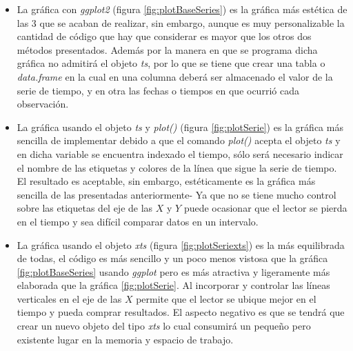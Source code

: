 \documentclass[
  spanish,
]{book}
\providecommand{\tightlist}{%
  \setlength{\itemsep}{0pt}\setlength{\parskip}{0pt}}
\theoremstyle{remark}
\begin{document}
\begin{itemize}
\tightlist
\item
  La gráfica con \emph{ggplot2} (figura \ref{fig:plotBaseSeries}) es la gráfica más estética de las 3 que se acaban de realizar, sin embargo, aunque es muy personalizable la cantidad de código que hay que considerar es mayor que los otros dos métodos presentados. Además por la manera en que se programa dicha gráfica no admitirá el objeto \emph{ts}, por lo que se tiene que crear una tabla o \emph{data.frame} en la cual en una columna deberá ser almacenado el valor de la serie de tiempo, y en otra las fechas o tiempos en que ocurrió cada observación.
\item
  La gráfica usando el objeto \emph{ts} y \emph{plot()} (figura \ref{fig:plotSerie}) es la gráfica más sencilla de implementar debido a que el comando \emph{plot()} acepta el objeto \emph{ts} y en dicha variable se encuentra indexado el tiempo, sólo será necesario indicar el nombre de las etiquetas y colores de la línea que sigue la serie de tiempo. El resultado es aceptable, sin embargo, estéticamente es la gráfica más sencilla de las presentadas anteriormente- Ya que no se tiene mucho control sobre las etiquetas del eje de las \(X\) y \(Y\) puede ocasionar que el lector se pierda en el tiempo y sea difícil comparar datos en un intervalo.
\item
  La gráfica usando el objeto \emph{xts} (figura \ref{fig:plotSeriexts}) es la más equilibrada de todas, el código es más sencillo y un poco menos vistosa que la gráfica \ref{fig:plotBaseSeries} usando \emph{ggplot} pero es más atractiva y ligeramente más elaborada que la gráfica \ref{fig:plotSerie}. Al incorporar y controlar las líneas verticales en el eje de las \(X\) permite que el lector se ubique mejor en el tiempo y pueda comprar resultados. El aspecto negativo es que se tendrá que crear un nuevo objeto del tipo \emph{xts} lo cual consumirá un pequeño pero existente lugar en la memoria y espacio de trabajo.
\end{itemize}

  
\end{document}

